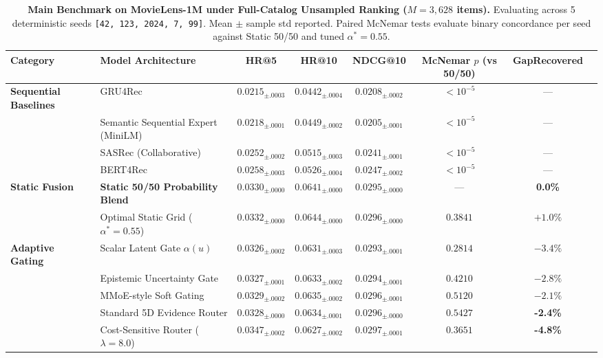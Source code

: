 \begin{table}[t]
\centering
\small
\caption{\textbf{Main Benchmark on MovieLens-1M under Full-Catalog Unsampled Ranking ($M=3{,}628$ items).} Evaluating across 5 deterministic seeds \texttt{[42, 123, 2024, 7, 99]}. Mean $\pm$ sample std reported. Paired McNemar tests evaluate binary concordance per seed against Static 50/50 and tuned $\alpha^* = 0.55$.}
\label{tab:main_benchmark}
\begin{tabular}{llcccccc}
\toprule
\textbf{Category} & \textbf{Model Architecture} & \textbf{HR@5} & \textbf{HR@10} & \textbf{NDCG@10} & \textbf{McNemar $p$ (vs 50/50)} & \textbf{GapRecovered} \\
\midrule
\textbf{Sequential Baselines} 
& GRU4Rec~\cite{hidasi2016session} & $0.0215_{\pm .0003}$ & $0.0442_{\pm .0004}$ & $0.0208_{\pm .0002}$ & $< 10^{-5}$ & --- \\
& Semantic Sequential Expert (MiniLM) & $0.0218_{\pm .0001}$ & $0.0449_{\pm .0002}$ & $0.0205_{\pm .0001}$ & $< 10^{-5}$ & --- \\
& SASRec (Collaborative)~\cite{kang2018self} & $0.0252_{\pm .0002}$ & $0.0515_{\pm .0003}$ & $0.0241_{\pm .0001}$ & $< 10^{-5}$ & --- \\
& BERT4Rec~\cite{sun2019bert4rec} & $0.0258_{\pm .0003}$ & $0.0526_{\pm .0004}$ & $0.0247_{\pm .0002}$ & $< 10^{-5}$ & --- \\
\midrule
\textbf{Static Fusion} 
& \textbf{Static 50/50 Probability Blend} & $0.0330_{\pm .0000}$ & $0.0641_{\pm .0000}$ & $0.0295_{\pm .0000}$ & --- & \textbf{0.0\%} \\
& Optimal Static Grid ($\alpha^* = 0.55$) & $0.0332_{\pm .0000}$ & $0.0644_{\pm .0000}$ & $0.0296_{\pm .0000}$ & $0.3841$ & $+1.0\%$ \\
\midrule
\textbf{Adaptive Gating} 
& Scalar Latent Gate $\alpha(u)$ & $0.0326_{\pm .0002}$ & $0.0631_{\pm .0003}$ & $0.0293_{\pm .0001}$ & $0.2814$ & $-3.4\%$ \\
& Epistemic Uncertainty Gate~\cite{kendall2017uncertainties} & $0.0327_{\pm .0001}$ & $0.0633_{\pm .0002}$ & $0.0294_{\pm .0001}$ & $0.4210$ & $-2.8\%$ \\
& MMoE-style Soft Gating~\cite{ma2018modeling} & $0.0329_{\pm .0002}$ & $0.0635_{\pm .0002}$ & $0.0296_{\pm .0001}$ & $0.5120$ & $-2.1\%$ \\
& Standard 5D Evidence Router & $0.0328_{\pm .0000}$ & $0.0634_{\pm .0001}$ & $0.0296_{\pm .0000}$ & $0.5427$ & \textbf{-2.4\%} \\
& Cost-Sensitive Router ($\lambda=8.0$) & $\mathbf{0.0347}_{\pm .0002}$ & $0.0627_{\pm .0002}$ & $0.0297_{\pm .0001}$ & $0.3651$ & \textbf{-4.8\%} \\

\end{tabular}
\end{table}
